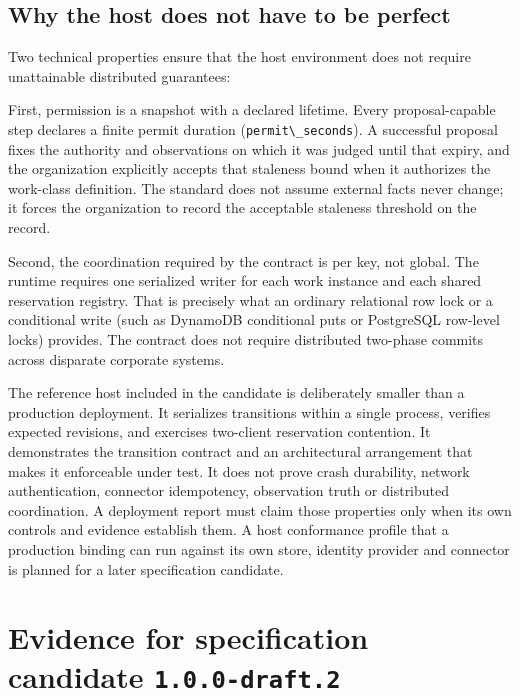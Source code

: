 \documentclass[
  american,
  11pt,
  letterpaper,
]{article}
\newcommand{\passthrough}[1]{#1}
\begin{document}
\subsection{Why the host does not have to be
perfect}\label{why-the-host-does-not-have-to-be-perfect}

Two technical properties ensure that the host environment does not
require unattainable distributed guarantees:

First, permission is a snapshot with a declared lifetime. Every
proposal-capable step declares a finite permit duration
(\passthrough{\lstinline!permit\_seconds!}). A successful proposal fixes
the authority and observations on which it was judged until that expiry,
and the organization explicitly accepts that staleness bound when it
authorizes the work-class definition. The standard does not assume
external facts never change; it forces the organization to record the
acceptable staleness threshold on the record.

Second, the coordination required by the contract is per key, not
global. The runtime requires one serialized writer for each work
instance and each shared reservation registry. That is precisely what an
ordinary relational row lock or a conditional write (such as DynamoDB
conditional puts or PostgreSQL row-level locks) provides. The contract
does not require distributed two-phase commits across disparate
corporate systems.

The reference host included in the candidate is deliberately smaller
than a production deployment. It serializes transitions within a single
process, verifies expected revisions, and exercises two-client
reservation contention. It demonstrates the transition contract and an
architectural arrangement that makes it enforceable under test. It does
not prove crash durability, network authentication, connector
idempotency, observation truth or distributed coordination. A deployment
report must claim those properties only when its own controls and
evidence establish them. A host conformance profile that a production
binding can run against its own store, identity provider and connector
is planned for a later specification candidate.

\section{\texorpdfstring{Evidence for specification candidate
\texttt{1.0.0-draft.2}}{Evidence for specification candidate 1.0.0-draft.2}}\label{evidence-for-specification-candidate-1.0.0-draft.2}
\end{document}
